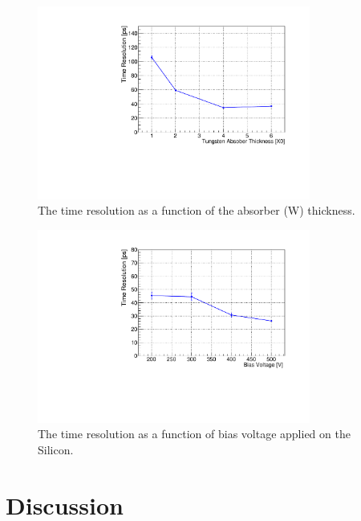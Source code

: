 \documentclass[12pt]{article}
\begin{document}
\begin{figure}[htbp] 
\centering
\includegraphics[width=0.8\textwidth]{plots/SigmaT_vs_X0_lin30Stamp.pdf} 
\caption{The time resolution as a function of the absorber (W) thickness. } 
\label{fig:SigmaT_vs_X0_lin30Stamp} 
\end{figure} 

\begin{figure}[htbp] 
\centering
\includegraphics[width=0.8\textwidth]{plots/SigmaT_vs_DV_lin30Stamp.pdf} 
\caption{The time resolution as a function of bias voltage applied on the Silicon. } 
\label{fig:SigmaT_vs_DV_lin30Stamp} 
\end{figure} 


\section{Discussion} 
\label{sec:discussion} 
\end{document}
